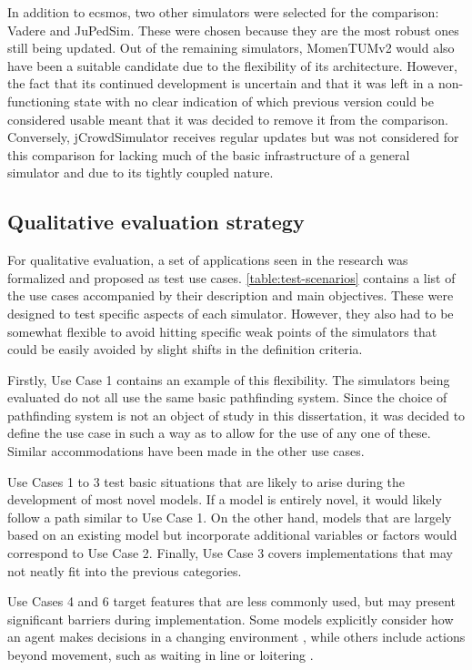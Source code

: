 \documentclass[twoside, 11pt]{article}
\begin{document}
In addition to \gls{ecsmos}, two other simulators were selected for the comparison: Vadere and JuPedSim. These were chosen because they are the most robust ones still being updated. Out of the remaining simulators, MomenTUMv2 would also have been a suitable candidate due to the flexibility of its architecture. However, the fact that its continued development is uncertain and that it was left in a non-functioning state with no clear indication of which previous version could be considered usable meant that it was decided to remove it from the comparison. Conversely, jCrowdSimulator receives regular updates but was not considered for this comparison for lacking much of the basic infrastructure of a general simulator and due to its tightly coupled nature.

\subsection{Qualitative evaluation strategy} \label{sec:qualitative-evaluation}

For qualitative evaluation, a set of applications seen in the research was formalized and proposed as test use cases. \autoref{table:test-scenarios} contains a list of the use cases accompanied by their description and main objectives. These were designed to test specific aspects of each simulator. However, they also had to be somewhat flexible to avoid hitting specific weak points of the simulators that could be easily avoided by slight shifts in the definition criteria. 

Firstly, Use Case 1 contains an example of this flexibility. The simulators being evaluated do not all use the same basic pathfinding system. Since the choice of pathfinding system is not an object of study in this dissertation, it was decided to define the use case in such a way as to allow for the use of any one of these. Similar accommodations have been made in the other use cases. 

Use Cases 1 to 3 test basic situations that are likely to arise during the development of most novel models. If a model is entirely novel, it would likely follow a path similar to Use Case 1. On the other hand, models that are largely based on an existing model but incorporate additional variables or factors would correspond to Use Case 2. Finally, Use Case 3 covers implementations that may not neatly fit into the previous categories.

Use Cases 4 and 6 target features that are less commonly used, but may present significant barriers during implementation. Some models explicitly consider how an agent makes decisions in a changing environment \cite{DEIULIIS2023104527}, while others include actions beyond movement, such as waiting in line or loitering \cite{KIM2013232, ALAM2022100527}. 
\end{document}
